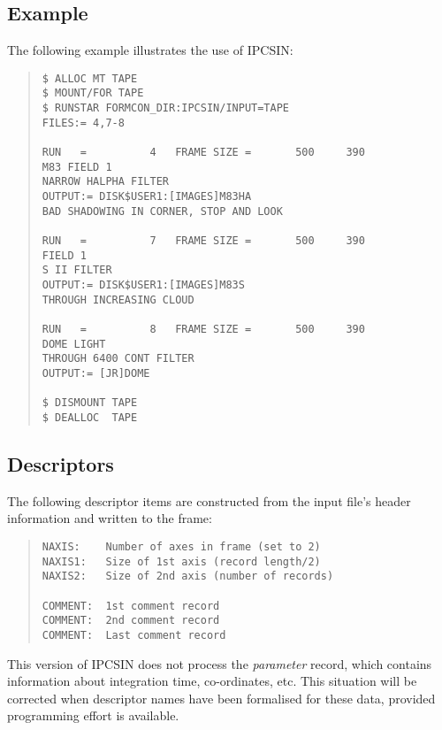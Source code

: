 \subsection {Example}
The following example illustrates the use of IPCSIN:
\begin{quote}
\begin{verbatim}
$ ALLOC MT TAPE
$ MOUNT/FOR TAPE
$ RUNSTAR FORMCON_DIR:IPCSIN/INPUT=TAPE
FILES:= 4,7-8

RUN   =          4   FRAME SIZE =       500     390
M83 FIELD 1
NARROW HALPHA FILTER
OUTPUT:= DISK$USER1:[IMAGES]M83HA
BAD SHADOWING IN CORNER, STOP AND LOOK

RUN   =          7   FRAME SIZE =       500     390
FIELD 1
S II FILTER
OUTPUT:= DISK$USER1:[IMAGES]M83S
THROUGH INCREASING CLOUD

RUN   =          8   FRAME SIZE =       500     390
DOME LIGHT
THROUGH 6400 CONT FILTER
OUTPUT:= [JR]DOME

$ DISMOUNT TAPE
$ DEALLOC  TAPE
\end{verbatim}
\end{quote}
\subsection {Descriptors}
The following descriptor items are constructed from the input file's header
information and written to the frame:
\begin{quote}
\begin{verbatim}
NAXIS:    Number of axes in frame (set to 2)
NAXIS1:   Size of 1st axis (record length/2)
NAXIS2:   Size of 2nd axis (number of records)

COMMENT:  1st comment record
COMMENT:  2nd comment record
COMMENT:  Last comment record
\end{verbatim}
\end{quote}
This version of IPCSIN does not process the {\em parameter} record, which
contains information about integration time, co-ordinates, etc.
This situation will be corrected when descriptor names have been formalised for
these data, provided programming effort is available.
